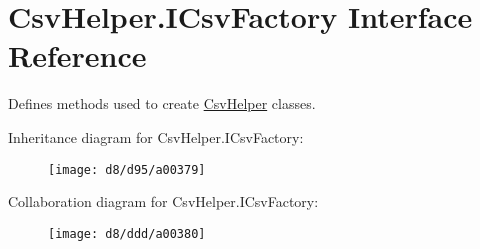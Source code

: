 \hypertarget{a00086}{\section{Csv\-Helper.\-I\-Csv\-Factory Interface Reference}
\label{a00086}
}


Defines methods used to create \hyperlink{a00281}{Csv\-Helper} classes.  




Inheritance diagram for Csv\-Helper.\-I\-Csv\-Factory\-:
\nopagebreak
\begin{figure}[H]
\begin{center}
\leavevmode
\texttt{[image: d8/d95/a00379]}
\end{center}
\end{figure}


Collaboration diagram for Csv\-Helper.\-I\-Csv\-Factory\-:
\nopagebreak
\begin{figure}[H]
\begin{center}
\leavevmode
\texttt{[image: d8/ddd/a00380]}
\end{center}
\end{figure}
